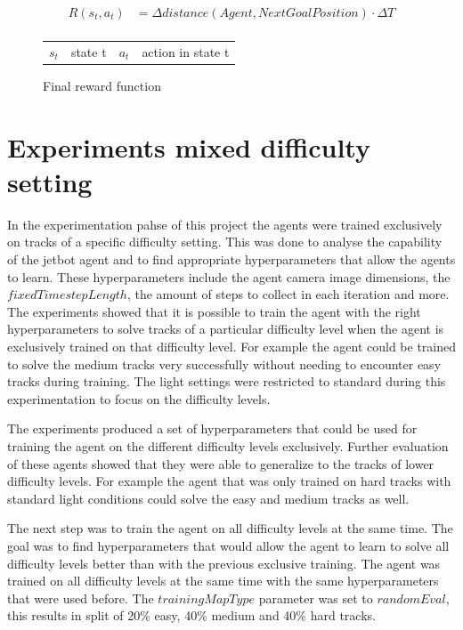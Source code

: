 \begin{figure}
    \centering
    \begin{align*}
         R(s_t,a_t) &= \Delta distance(Agent, NextGoalPosition) \cdot \Delta T \nonumber \\
    \end{align*}
    \caption{Final reward function}
    \begin{tabular}{r@{: }l r@{: }l}
    $s_t$& state t & $a_t$& action in state t 
    \end{tabular}
    \label{fig:final_reward_function}
\end{figure}


\section{Experiments mixed difficulty setting}
\label{cha:experiment_mixed_difficulty}

In the experimentation pahse of this project the agents were trained exclusively on tracks of a specific difficulty setting. This was done to analyse the capability of the jetbot agent and to find appropriate hyperparameters that allow the agents to learn. These hyperparameters include the agent camera image dimensions, the $fixedTimestepLength$, the amount of steps to collect in each iteration and more. 
The experiments showed that it is possible to train the agent with the right hyperparameters to solve tracks of a particular difficulty level when the agent is exclusively trained on that difficulty level. For example the agent could be trained to solve the medium tracks very successfully without needing to encounter easy tracks during training. The light settings were restricted to standard during this experimentation to focus on the difficulty levels.

The experiments produced a set of hyperparameters that could be used for training the agent on the different difficulty levels exclusively. Further evaluation of these agents showed that they were able to generalize to the tracks of lower difficulty levels. For example the agent that was only trained on hard tracks with standard light conditions could solve the easy and medium tracks as well.

The next step was to train the agent on all difficulty levels at the same time. The goal was to find hyperparameters that would allow the agent to learn to solve all difficulty levels better than with the previous exclusive training. The agent was trained on all difficulty levels at the same time with the same hyperparameters that were used before. The $trainingMapType$ parameter was set to $randomEval$, this results in split of 20\% easy, 40\% medium and 40\% hard tracks.


